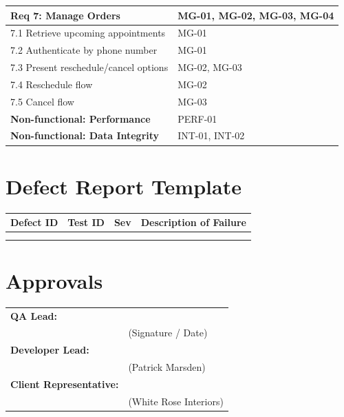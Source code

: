 ﻿\documentclass[11pt, a4paper]{article}
\begin{document}
\begin{longtable}{|p{}|p{}|}
    \textbf{Req 7: Manage Orders} & MG-01, MG-02, MG-03, MG-04 \\ \hline
    7.1 Retrieve upcoming appointments & MG-01 \\ \hline
    7.2 Authenticate by phone number & MG-01 \\ \hline
    7.3 Present reschedule/cancel options & MG-02, MG-03 \\ \hline
    7.4 Reschedule flow & MG-02 \\ \hline
    7.5 Cancel flow & MG-03 \\ \hline

    \textbf{Non-functional: Performance} & PERF-01 \\ \hline
    \textbf{Non-functional: Data Integrity} & INT-01, INT-02 \\ \hline

\end{longtable}

\section{Defect Report Template}
\begin{table}[h]
    \centering
    \renewcommand{\arraystretch}{1.5}
    \begin{tabular}{|p{}|p{}|p{}|p{}|}
        \hline
        \rowcolor{headergray} \textbf{Defect ID} & \textbf{Test ID} & \textbf{Sev} & \textbf{Description of Failure} \\
        \hline
        & & & \\
        \hline
        & & & \\
        \hline
    \end{tabular}
\end{table}

\section{Approvals}
\vspace{1cm}
\begin{tabular}{p{} p{}}
    \textbf{QA Lead:} & \hrulefill \\
    & \small{(Signature / Date)} \\[1cm]
    
    \textbf{Developer Lead:} & \hrulefill \\
    & \small{(Patrick Marsden)} \\[1cm]
    
    \textbf{Client Representative:} & \hrulefill \\
    & \small{(White Rose Interiors)} \\
\end{tabular}
\end{document}
